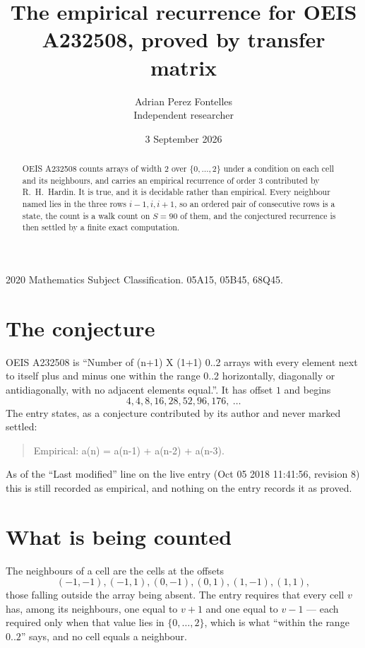 \documentclass[11pt,a4paper]{article}
\title{The empirical recurrence for OEIS A232508, proved by transfer matrix}
\author{Adrian Perez Fontelles\\ \small Independent researcher}
\date{3 September 2026}
\theoremstyle{plain}
\theoremstyle{definition}
\begin{document}
\maketitle

\begin{abstract}
OEIS A232508 counts arrays of width $2$ over $\{0,\dots,2\}$ under a condition on each cell
and its neighbours, and carries an empirical recurrence of order $3$ contributed by
R.~H.~Hardin. It is true, and it is decidable rather than empirical. Every neighbour named lies
in the three rows $i-1,i,i+1$, so an ordered pair of consecutive rows is a state, the count is
a walk count on $S=90$ of them, and the conjectured recurrence is then settled by a finite
exact computation.
\end{abstract}

\noindent\small 2020 Mathematics Subject Classification. 05A15, 05B45, 68Q45.\normalsize

\section{The conjecture}

OEIS A232508 is ``Number of (n+1) X (1+1) 0..2 arrays with every element next to itself plus and minus one within the range 0..2 horizontally, diagonally or antidiagonally, with no adjacent elements equal.''. It has offset $1$ and begins
\[
4, 4, 8, 16, 28, 52, 96, 176,\ \dots
\]
The entry states, as a conjecture contributed by its author and never marked settled:
\begin{quote}
Empirical: a(n) = a(n-1) + a(n-2) + a(n-3).
\end{quote}
As of the ``Last modified'' line on the live entry (Oct 05 2018 11:41:56, revision 8) this is still
recorded as empirical, and nothing on the entry records it as proved.

\section{What is being counted}

The neighbours of a cell are the cells at the offsets
\[
(-1,-1), (-1,1), (0,-1), (0,1), (1,-1), (1,1),
\]
those falling outside the array being absent. The entry requires that every cell $v$ has, among its neighbours, one equal to $v+1$ and one equal to $v-1$ --- each required only when that value lies in $\{0,\dots,2\}$, which is what ``within the range $0..2$'' says, and no cell equals a neighbour.
\end{document}
